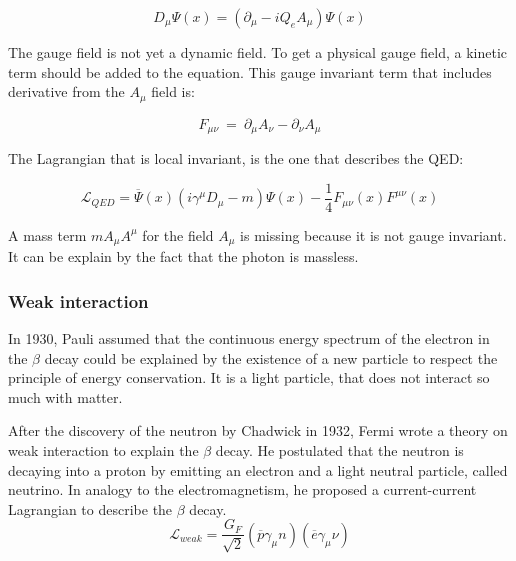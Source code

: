       \begin{equation}
        D_{\mu} \Psi\left(x\right) =  \left(\partial_{\mu} - i Q_e A_{\mu}\right) \Psi\left(x\right)
      \end{equation}

     The gauge field is not yet a dynamic field. To get a physical gauge field, a kinetic term should be added to the equation.
     This gauge invariant term that includes derivative from the $A_{\mu}$ field is:
    
     \begin{equation}
       F_{\mu \nu} \ = \ \partial_\mu A_\nu - \partial_\nu A_\mu
     \end{equation}

     The Lagrangian that is local invariant, is the one that describes the QED:

    \begin{equation}
    	\mathcal{L}_{QED} =  \overline{\Psi}\left(x\right)\left( i \gamma^\mu D_\mu - m \right) \Psi\left(x\right) - \frac{1}{4}F_{\mu \nu}\left(x\right) F^{\mu \nu}\left(x\right)
    \end{equation}

    A mass term $m A_{\mu} A^{\mu}$ for the field $A_{\mu}$ is missing because it is not gauge invariant. It can be explain by the fact that the photon is massless.


    \subsubsection{Weak interaction}

    In 1930, Pauli assumed that the continuous energy spectrum of the electron in the $\beta$ decay could be explained by the existence of a new particle to respect the principle of energy conservation. 
    It is a light particle, that does not interact so much with matter.

    After the discovery of the neutron by Chadwick in 1932, Fermi wrote a theory on weak interaction to explain the $\beta$ decay. \cite{Fermi:1934hr} 
    He postulated that the neutron is decaying into a proton by emitting an electron and a light neutral particle, called neutrino.
    In analogy to the electromagnetism, he proposed a current-current Lagrangian to describe the $\beta$ decay.
    \begin{equation}
\mathcal{L}_{weak} = \frac{G_F}{\sqrt{2}}\left(\overline{p} \gamma_{\mu} n \right) \left(\overline{e} \gamma_{\mu} \nu \right)
    \end{equation}


